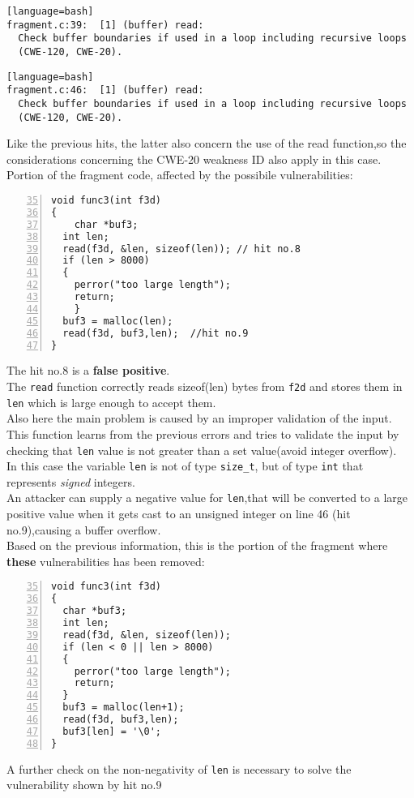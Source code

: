 \documentclass[a4paper,12pt]{article}
\begin{document}
\begin{lstlisting}[style=DOS][language=bash]
fragment.c:39:  [1] (buffer) read:
  Check buffer boundaries if used in a loop including recursive loops
  (CWE-120, CWE-20).
\end{lstlisting}

\begin{lstlisting}[style=DOS][language=bash]
fragment.c:46:  [1] (buffer) read:
  Check buffer boundaries if used in a loop including recursive loops
  (CWE-120, CWE-20).
\end{lstlisting}
Like the previous hits, the latter also concern the use of the read function,so the considerations concerning the CWE-20 weakness ID also apply in this case.\\

\noindent
Portion of the fragment code, affected by the possibile vulnerabilities:
\begin{lstlisting}[style=c,numbers=left,firstnumber=35,linebackgroundcolor={
\ifnum\value{lstnumber}=39\color{green}\fi
\ifnum\value{lstnumber}=46\color{red}\fi}]
void func3(int f3d)
{
	char *buf3;
  int len;
  read(f3d, &len, sizeof(len)); // hit no.8
  if (len > 8000) 
  { 
  	perror("too large length");
  	return; 
	}
  buf3 = malloc(len);
  read(f3d, buf3,len);	//hit no.9
}
\end{lstlisting}
The hit no.8 is a \textbf{false positive}.\\
The \texttt{read} function correctly reads sizeof(len) bytes from \texttt{f2d} and stores them in \texttt{len} which is large enough to accept them.\\
Also here the main problem is caused by an improper validation of the input.\\
This function learns from the previous errors and tries to validate the input by checking that \texttt{len} value is not greater than a set value(avoid integer overflow).\\
In this case the variable \texttt{len} is not of type \texttt{size\_t}, but of type \texttt{int} that represents \emph{signed} integers.\\
An attacker can supply a negative value for \texttt{len},that  will be converted to a large positive value when it gets cast to an unsigned integer on line 46 (hit no.9),causing a buffer overflow.\\
\newpage
\noindent
Based on the previous information, this is the portion of the fragment where \textbf{these} vulnerabilities has been removed:
\begin{lstlisting}[style=c,numbers=left,firstnumber=35,linebackgroundcolor={
\ifnum\value{lstnumber}=39\color{green}\fi
\ifnum\value{lstnumber}=40\color{green}\fi
\ifnum\value{lstnumber}=46\color{green}\fi}]
void func3(int f3d)
{
  char *buf3;
  int len;
  read(f3d, &len, sizeof(len));
  if (len < 0 || len > 8000) 
  { 
  	perror("too large length");
  	return; 
  }
  buf3 = malloc(len+1);
  read(f3d, buf3,len);
  buf3[len] = '\0';        
}
\end{lstlisting}
A further check on the non-negativity of \texttt{len} is necessary to solve the vulnerability shown by hit no.9
\newpage
\end{document}
